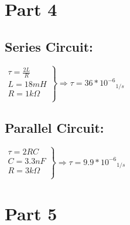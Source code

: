 \documentclass[a4paper,twoside]{report}
\begin{document}
    \section*{Part 4}
    {
        \begin{multicols}{2}\setlength{\columnseprule}{0pt}
            \subsection*{Series Circuit:}
                $
                    \left.
                    \begin{array}{l}
                        \tau = \frac{2L}{R} \\
                        L = 18mH \\
                        R = 1k\Omega \\
                    \end{array}
                    \right\}
                    \Longrightarrow
                    \tau = {36 * 10^{-6}}_{1/s}
                $
            \vfill\null
            \columnbreak
            \subsection*{Parallel Circuit:}
                $
                    \left.
                    \begin{array}{l}
                        \tau = 2RC \\
                        C = 3.3nF \\
                        R = 3k\Omega \\
                    \end{array}
                    \right\}
                    \Longrightarrow
                    \tau = {9.9 * 10^{-6}}_{1/s}
                $
        \end{multicols}
    }

    \section*{Part 5}
\end{document}
